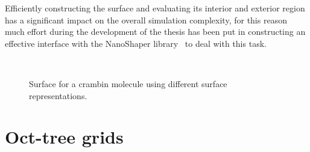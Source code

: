 \documentclass[11pt,a4paper,twocolumn]{article}
\begin{document}
Efficiently constructing the surface and evaluating its interior and exterior region has a significant impact on
the overall simulation complexity, for this reason much
effort during the development of the thesis has been put
in constructing an effective interface with the NanoShaper library~\cite{ref8} to deal with this task.  

\begin{figure}
    \centering
    \,
    \,
    \,
    \caption{Surface for a crambin molecule using different surface representations.}
    \label{fig:blobbyvsskin}
\end{figure}

\section{Oct-tree grids}
\label{sec:octrees}
\end{document}

